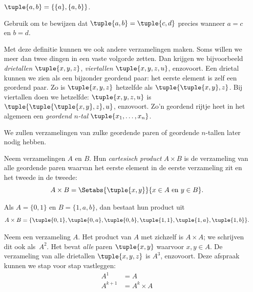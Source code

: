 \documentclass[openany]{memoir}
\begin{document}
\begin{defn}
	$\tuple{a, b} = \{\{a\}, \{a, b\}\}$.
\end{defn}

\begin{prob}
	Gebruik  om te bewijzen dat
	$\tuple{a, b}= \tuple{c, d}$ precies wanneer $a = c$ en $b=d$.
\end{prob}

\begin{explain}
Met deze definitie kunnen we ook andere verzamelingen maken. Soms
willen we meer dan twee dingen in een vaste volgorde zetten. Dan
krijgen we bijvoorbeeld \emph{drietallen} $\tuple{x, y, z}$,
\emph{viertallen} $\tuple{x, y, z, u}$, enzovoort. Een drietal kunnen
we zien als een bijzonder geordend paar: het eerste element is zelf
een geordend paar. Zo is $\tuple{x, y, z}$ hetzelfde als
$\tuple{\tuple{x, y},z}$. Bij viertallen doen we hetzelfde:
$\tuple{x,y,z,u}$ is $\tuple{\tuple{\tuple{x,y},z},u}$, enzovoort.
Zo'n geordend rijtje heet in het algemeen een
\emph{geordend $n$-tal} $\tuple{x_1, \dots, x_n}$.

We zullen verzamelingen van zulke geordende paren of geordende $n$-tallen later
nodig hebben.
\end{explain}

\begin{defn}
Neem verzamelingen $A$ en $B$. Hun \emph{cartesisch product} $A
\times B$ is de verzameling van alle geordende paren waarvan het eerste
element in de eerste verzameling zit en het tweede in de tweede:
\[
  A \times B = \Setabs{\tuple{x, y}}{x \in A \text{ en } y \in B}.
\]
\end{defn}

\begin{ex}
Als $A = \{0, 1\}$ en $B = \{1, a, b\}$, dan bestaat hun product uit
\[
A \times B = \{ \tuple{0, 1}, \tuple{0, a}, \tuple{0, b},
    \tuple{1, 1}, \tuple{1, a}, \tuple{1, b} \}.
\]
\end{ex}

\begin{ex}
Neem een verzameling $A$. Het product van $A$ met zichzelf is $A
\times A$; we schrijven dit ook als~$A^2$. Het bevat \emph{alle}
paren $\tuple{x, y}$ waarvoor $x, y \in A$. De verzameling van alle
drietallen $\tuple{x, y, z}$ is $A^3$, enzovoort. Deze afspraak kunnen
we stap voor stap vastleggen:
\begin{align*}
  A^1 & = A\\
  A^{k+1} & = A^k \times A
\end{align*}
\end{ex}
\end{document}
